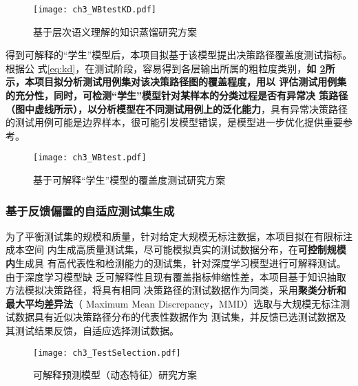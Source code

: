 \begin{figure}[htp]
    \begin{small}
        \begin{center}
            \texttt{[image: ch3\_WBtestKD.pdf]}
        \end{center}
        \caption{基于层次语义理解的知识蒸馏研究方案}
        \label{fig:ch3:WBtestKD}
    \end{small}
\end{figure}

得到可解释的``学生''模型后，本项目拟基于该模型提出决策路径覆盖度测试指标。根据公
式\eqref{eq:kd}，在测试阶段，容易得到各层输出所属的粗粒度类别，\textbf{如
\cref{fig:ch3:WBtest}所示，本项目拟分析测试用例集对该决策路径图的覆盖程度，用以
评估测试用例集的充分性，同时，可检测``学生''模型针对某样本的分类过程是否有异常决
策路径（图中虚线所示），以分析模型在不同测试用例上的泛化能力}，具有异常决策路径
的测试用例可能是边界样本，很可能引发模型错误，是模型进一步优化提供重要参考。
\begin{figure}[htp]
    \begin{small}
        \begin{center}
            \texttt{[image: ch3\_WBtest.pdf]}
        \end{center}
        \caption{基于可解释``学生''模型的覆盖度测试研究方案}
        \label{fig:ch3:WBtest}
    \end{small}
\end{figure}

\subsubsection{基于反馈偏置的自适应测试集生成}\label{ch3_3}

为了平衡测试集的规模和质量，针对给定大规模无标注数据，本项目拟在有限标注成本空间
内生成高质量测试集，尽可能模拟真实的测试数据分布，在\textbf{可控制规模内}生成具
有高代表性和检测能力的测试集，针对深度学习模型进行可解释测试。由于深度学习模型缺
乏可解释性且现有覆盖指标伸缩性差，本项目基于知识抽取方法模拟决策路径，将具有相同
决策路径的测试数据作为同类，采用\textbf{聚类分析和最大平均差异法}（ Maximum Mean
Discrepancy，MMD）选取与大规模无标注测试数据具有近似决策路径分布的代表性数据作为
测试集，并反馈已选测试数据及其测试结果反馈，自适应选择测试数据。


\begin{figure}[htp]
    \begin{small}
        \begin{center}
            \texttt{[image: ch3\_TestSelection.pdf]}
        \end{center}
        \caption{可解释预测模型（动态特征）研究方案}
        \label{fig:ch3:interpretability}
    \end{small}
\end{figure}

